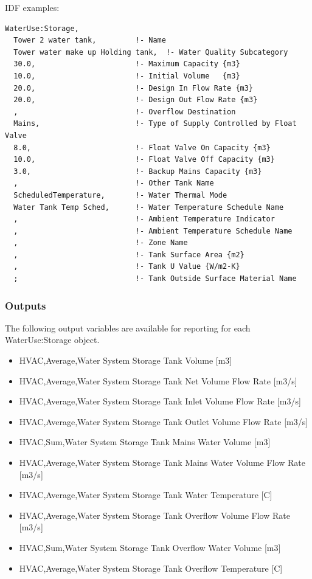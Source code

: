 IDF examples:

\begin{lstlisting}
WaterUse:Storage,
  Tower 2 water tank,         !- Name
  Tower water make up Holding tank,  !- Water Quality Subcategory
  30.0,                       !- Maximum Capacity {m3}
  10.0,                       !- Initial Volume   {m3}
  20.0,                       !- Design In Flow Rate {m3}
  20.0,                       !- Design Out Flow Rate {m3}
  ,                           !- Overflow Destination
  Mains,                      !- Type of Supply Controlled by Float Valve
  8.0,                        !- Float Valve On Capacity {m3}
  10.0,                       !- Float Valve Off Capacity {m3}
  3.0,                        !- Backup Mains Capacity {m3}
  ,                           !- Other Tank Name
  ScheduledTemperature,       !- Water Thermal Mode
  Water Tank Temp Sched,      !- Water Temperature Schedule Name
  ,                           !- Ambient Temperature Indicator
  ,                           !- Ambient Temperature Schedule Name
  ,                           !- Zone Name
  ,                           !- Tank Surface Area {m2}
  ,                           !- Tank U Value {W/m2-K}
  ;                           !- Tank Outside Surface Material Name
\end{lstlisting}

\subsubsection{Outputs}\label{outputs-2-026}

The following output variables are available for reporting for each WaterUse:Storage object.

\begin{itemize}
\item
  HVAC,Average,Water System Storage Tank Volume {[}m3{]}
\item
  HVAC,Average,Water System Storage Tank Net Volume Flow Rate {[}m3/s{]}
\item
  HVAC,Average,Water System Storage Tank Inlet Volume Flow Rate {[}m3/s{]}
\item
  HVAC,Average,Water System Storage Tank Outlet Volume Flow Rate {[}m3/s{]}
\item
  HVAC,Sum,Water System Storage Tank Mains Water Volume {[}m3{]}
\item
  HVAC,Average,Water System Storage Tank Mains Water Volume Flow Rate {[}m3/s{]}
\item
  HVAC,Average,Water System Storage Tank Water Temperature {[}C{]}
\item
  HVAC,Average,Water System Storage Tank Overflow Volume Flow Rate {[}m3/s{]}
\item
  HVAC,Sum,Water System Storage Tank Overflow Water Volume {[}m3{]}
\item
  HVAC,Average,Water System Storage Tank Overflow Temperature {[}C{]}
\end{itemize}

